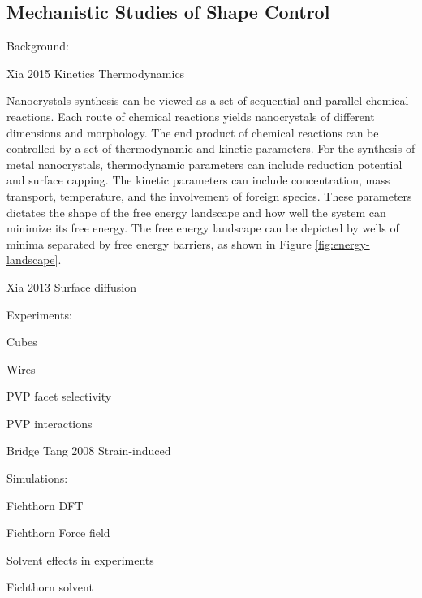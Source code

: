 \subsection{Mechanistic Studies of Shape Control}

Background:

Xia 2015 Kinetics Thermodynamics

Nanocrystals synthesis can be viewed as a set of sequential and parallel chemical reactions.
Each route of chemical reactions yields nanocrystals of different dimensions and morphology.
The end product of chemical reactions can be controlled by a set of thermodynamic and kinetic parameters.
For the synthesis of metal nanocrystals, thermodynamic parameters can include reduction potential and surface capping.
The kinetic parameters can include concentration, mass transport, temperature, and the involvement of foreign species.
These parameters dictates the shape of the free energy landscape and how well the system can minimize its free energy.
The free energy landscape can be depicted by wells of minima separated by free energy barriers, as shown in Figure \ref{fig:energy-landscape}.

Xia 2013 Surface diffusion

Experiments:

Cubes

Wires

PVP facet selectivity

PVP interactions

Bridge Tang 2008 Strain-induced

Simulations:

Fichthorn DFT

Fichthorn Force field

Solvent effects in experiments

Fichthorn solvent
  
  
  
